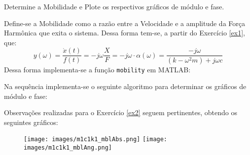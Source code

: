 \documentclass{article}
\begin{document}
\newpage
\begin{exercise}\label{ex3}
    Determine a Mobilidade e Plote os respectivos gráficos de módulo e fase.
\end{exercise}
\begin{resolution}
    Define-se a Mobilidade como a razão entre a Velocidade e a amplitude da Força Harmônica que exita o sistema. Dessa forma tem-se, a partir do Exercício \ref{ex1}, que:
    \begin{equation}
        \boxed{
            y (\omega) = 
            \frac{\dot{x}(t)}{f(t)} = 
            -j\omega\frac{X}{F} = 
            -j\omega \cdot \alpha(\omega) = 
            \frac{-j\omega}{(k -\omega^2 m) + j \omega c}
        }
    \end{equation}
    Dessa forma implementa-se a função \texttt{mobility} em MATLAB:
    \begin{scriptsize}
        \myMatlab
    \end{scriptsize}
    Na sequência implementa-se o seguinte algoritmo para determinar os gráficos de módulo e fase:
    \begin{scriptsize}
        \myMatlab
    \end{scriptsize}
    Observações realizadas para o Exercício \ref{ex2} seguem pertinentes, obtendo os seguintes gráficos:
    \begin{figure}[H]
        \centering
        \texttt{[image: images/m1c1k1\_mblAbs.png]}
        \texttt{[image: images/m1c1k1\_mblAng.png]}
    \end{figure}
\end{resolution}
\end{document}
